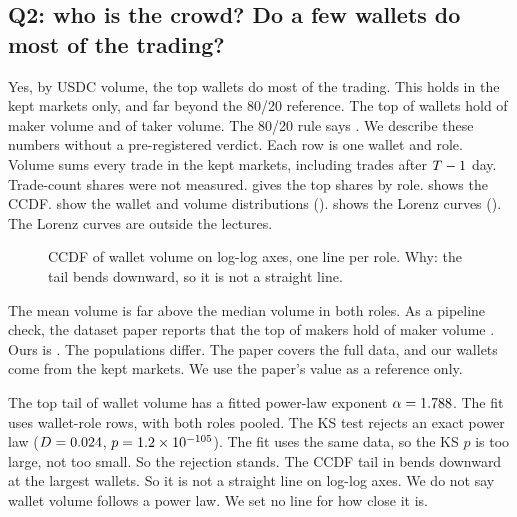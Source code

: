 \subsection{Q2: who is the crowd? Do a few wallets do most of the trading?}\label{sec:res-q2}
Yes, by USDC volume, the top wallets do most of the trading.
This holds in the kept markets only, and far beyond the 80/20 reference.
The top \TopTwentyLabel{} of wallets hold \MakerTopTwentyShare{} of maker volume and \TakerTopTwentyShare{} of taker volume.
The 80/20 rule says \TopTwentyReference.
We describe these numbers without a pre-registered verdict.
Each row is one wallet and role.
Volume sums every trade in the kept markets, including trades after $T-1$ day.
Trade-count shares were not measured.
 gives the top shares by role.
 shows the CCDF.
 show the wallet and volume distributions ().
 shows the Lorenz curves ().
The Lorenz curves are outside the lectures.


\begin{figure}[H]
\centering
{}
\caption{CCDF of wallet volume on log-log axes, one line per role. Why: the tail bends downward, so it is not a straight line.}%
\label{fig:ccdf}
\end{figure}

The mean volume is far above the median volume in both roles.
As a pipeline check, the dataset paper reports that the top \TopOneLabel{} of makers hold \PaperTopShare{} of maker volume \citep{qin2026polymarketv1}.
Ours is \MakerTopOneShare.
The populations differ.
The paper covers the full data, and our wallets come from the kept markets.
We use the paper's value as a reference only.

The top \TopTenLabel{} tail of wallet volume has a fitted power-law exponent $\alpha=1.788$.
The fit uses \WalletVolumePowerNTail{} wallet-role rows, with both roles pooled.
The KS test rejects an exact power law ($D=0.024$, $p=1.2\times10^{-105}$).
The fit uses the same data, so the KS $p$ is too large, not too small.
So the rejection stands.
The CCDF tail in  bends downward at the largest wallets.
So it is not a straight line on log-log axes.
We do not say wallet volume follows a power law.
We set no line for how close it is.

